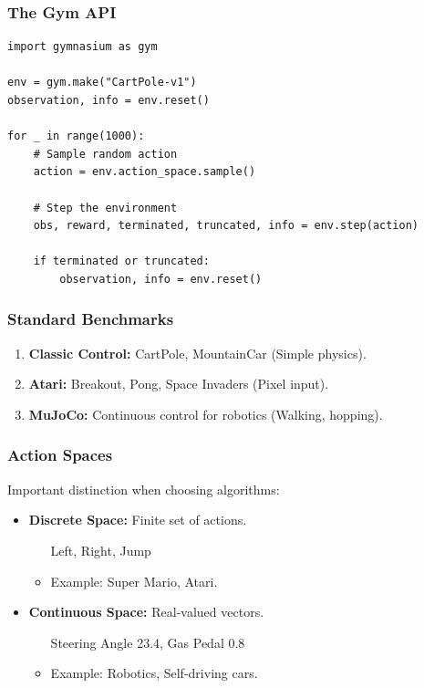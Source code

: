 \documentclass[aspectratio=169]{beamer}
\begin{document}
\begin{frame}[fragile]
    \frametitle{The Gym API}
    \begin{lstlisting}
import gymnasium as gym

env = gym.make("CartPole-v1")
observation, info = env.reset()

for _ in range(1000):
    # Sample random action
    action = env.action_space.sample()

    # Step the environment
    obs, reward, terminated, truncated, info = env.step(action)

    if terminated or truncated:
        observation, info = env.reset()
    \end{lstlisting}
\end{frame}

\begin{frame}
    \frametitle{Standard Benchmarks}
    \begin{enumerate}
        \item \textbf{Classic Control:} CartPole, MountainCar (Simple physics).
        \item \textbf{Atari:} Breakout, Pong, Space Invaders (Pixel input).
        \item \textbf{MuJoCo:} Continuous control for robotics (Walking, hopping).
    \end{enumerate}
\end{frame}

\begin{frame}
    \frametitle{Action Spaces}
    Important distinction when choosing algorithms:
    \vspace{0.5cm}
    \begin{itemize}
        \item \textbf{Discrete Space:} Finite set of actions.
        \begin{itemize}
            \item [Left, Right, Jump]
            \item Example: Super Mario, Atari.
        \end{itemize}
        \item \textbf{Continuous Space:} Real-valued vectors.
        \begin{itemize}
            \item [Steering Angle 23.4, Gas Pedal 0.8]
            \item Example: Robotics, Self-driving cars.
        \end{itemize}
    \end{itemize}
\end{frame}
\end{document}
